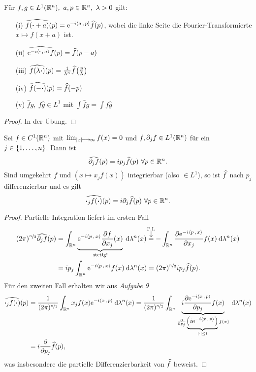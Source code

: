 \documentclass[skript.tex]{subfiles}
\begin{document}
\begin{lem}
	Für $f,g \in L^1(\Rn),\ a,p \in \Rn,\ \lambda >0$ gilt:
	\begin{itemize}
		\item[(i)] $\widehat{f(\boldsymbol{\cdot} + a)}(p) = \mathrm{e}^{-i \langle a\,{,}\,p \rangle} \widehat{f}(p)$, wobei die linke Seite die Fourier-Transformierte $x\mapsto f(x+a)$ ist.
		\item[(ii)] $\widehat{\mathrm{e}^{-i \langle \boldsymbol{\cdot}\,{,}\,a \rangle}f}(p) = \widehat{f}(p-a)$
		\item[(iii)] $\widehat{f(\lambda \bcdot)}(p) = \frac{1}{\lambda^n} \widehat{f} \pr{\frac{p}{\lambda}}$
		\item[(iv)] $\widehat{f(- \boldsymbol{\cdot})}(p) = \widehat{f}(-p)$
		\item[(v)] 	$\widehat{f}g,\ f\widehat{g} \in L^1$ mit $ \int \widehat{f}g = \int f \widehat{g}$
{}	\end{itemize}
\end{lem}

\begin{proof}
	In der Übung.
\end{proof}

\begin{lem}
	Sei $f \in C^1({\mathbb{R}^n}) $ mit $\lim_{\left| x \right|\kern -1pt \longrightarrow \kern -1pt\infty} f(x) = 0$ und $f, \partial_j f \in L^1({\mathbb{R}^n})$ für ein \\$j \in \left\{1,\dotsc,n\right\}$. Dann ist 
	\[
		\widehat{\partial_j f} (p) = ip_j \widehat{f} (p)\ \forall p \in {\mathbb{R}^n}.
	\]
	Sind umgekehrt $f$ und $(x\mapsto x_j f(x))$ integrierbar (also $\in L^1$), so ist $\widehat{f}$ nach $p_j$ differenzierbar und es gilt
	\[
		\widehat{\boldsymbol{\cdot}_j f(\boldsymbol{\cdot})} (p) = i\partial_j \widehat{f} (p)\ \forall p \in {\mathbb{R}^n}.
	\]
\end{lem}

\begin{proof}
	Partielle Integration liefert im ersten Fall
	\begin{align*}
		(2\pi)^{\nicefrac{n}{2}} \wh{\del_j f} (p) &= \int_{\Rn} \underbrace{\e^{-i \skp{p}{x}} \ddel{f}{x_j} (x)}_{\text{stetig!}} \md \lambda^n(x) \darrow{\text{P.I.}}{=} - \int_\Rn \ddel{\e^{-i \skp{p}{x}}}{x_j} f(x) \md \lambda^n(x)\\
		&= i p_j \int_\Rn \e^{-i\skp{p}{x}} f(x) \md \lambda^n(x) = (2\pi)^{\nicefrac{n}{2}} i p_j \wh{f}(p).
	\end{align*}
	Für den zweiten Fall erhalten wir aus \textit{Aufgabe 9}
	\begin{align*}
		\wh{\bcdot_j f(\bcdot)} (p) &= \frac{1}{(2\pi)^{\nicefrac{n}{2}}} \int_\Rn x_j f(x) \e^{-i \skp{x}{p}} \md \lambda^n(x) = \frac{1}{(2\pi)^{\nicefrac{n}{2}}} \int_\Rn \underbrace{i \ddel{\e^{-i \skp{x}{p}}}{p_j} f(x)}_{\ddel{}{p_j}\underbrace{\pr{i \e^{-i \skp{x}{p}} }}_{\abs{\cdot} \leq 1} f(x)}   \md \lambda^n(x)\\
		&= i \ddel{}{p_j} \wh{f}(p),
	\end{align*}
	was insbesondere die partielle Differenzierbarkeit von $\widehat{f}$ beweist. 
\end{proof}
\end{document}
